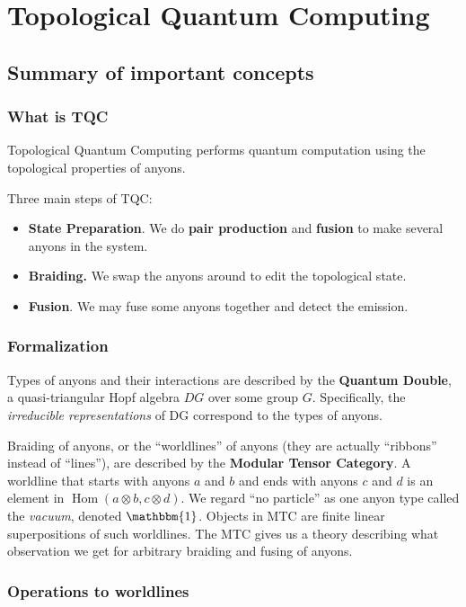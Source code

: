 
\section{Topological Quantum Computing}
\subsection{Summary of important concepts}
\subsubsection{What is TQC}

Topological Quantum Computing performs quantum computation using the topological properties of anyons. 

Three main steps of TQC:
\begin{itemize}
	\item \textbf{State Preparation}. We do \textbf{pair production} and \textbf{fusion} to make several anyons in the system.
	\item \textbf{Braiding.} We swap the anyons around to edit the topological state.
	\item \textbf{Fusion}. We may fuse some anyons together and detect the emission. 
\end{itemize}

\subsubsection{Formalization}

Types of anyons and their interactions are described by the \textbf{Quantum Double}, a quasi-triangular Hopf algebra $DG$ over some group $G$. Specifically, the \textit{irreducible representations} of DG correspond to the types of anyons. 

Braiding of anyons, or the ``worldlines'' of anyons (they are actually ``ribbons'' instead of ``lines''), are described by the \textbf{Modular Tensor Category}. A worldline that starts with anyons $a$ and $b$ and ends with anyons $c$ and $d$ is an element in $\operatorname{Hom}(a \otimes b, c \otimes d)$. We regard ``no particle'' as one anyon type called the \textit{vacuum}, denoted $\mathbbm{1}$. Objects in MTC are finite linear superpositions of such worldlines.
The MTC gives us a theory describing what observation we get for arbitrary braiding and fusing of anyons.

\subsubsection{Operations to worldlines}

